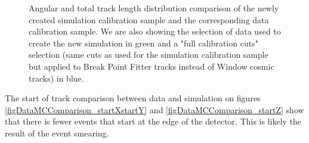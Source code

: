 \documentclass[12pt]{article}
\begin{document}
\begin{figure}[!ht]

\caption{Angular and total track length distribution comparison of the newly created simulation calibration sample and the corresponding data calibration sample. We are also showing the selection of data used to create the new simulation in green and a "full calibration cuts" selection (same cuts as used for the simulation calibration sample but applied to Break Point Fitter tracks instead of Window cosmic tracks) in blue.}
\label{figDataMCComparison_cosZtotLength}
\end{figure}

The start of track comparison between data and simulation on figures \ref{figDataMCComparison_startXstartY} and \ref{figDataMCComparison_startZ} show that there is fewer events that start at the edge of the detector. This is likely the result of the event smearing.
\end{document}
